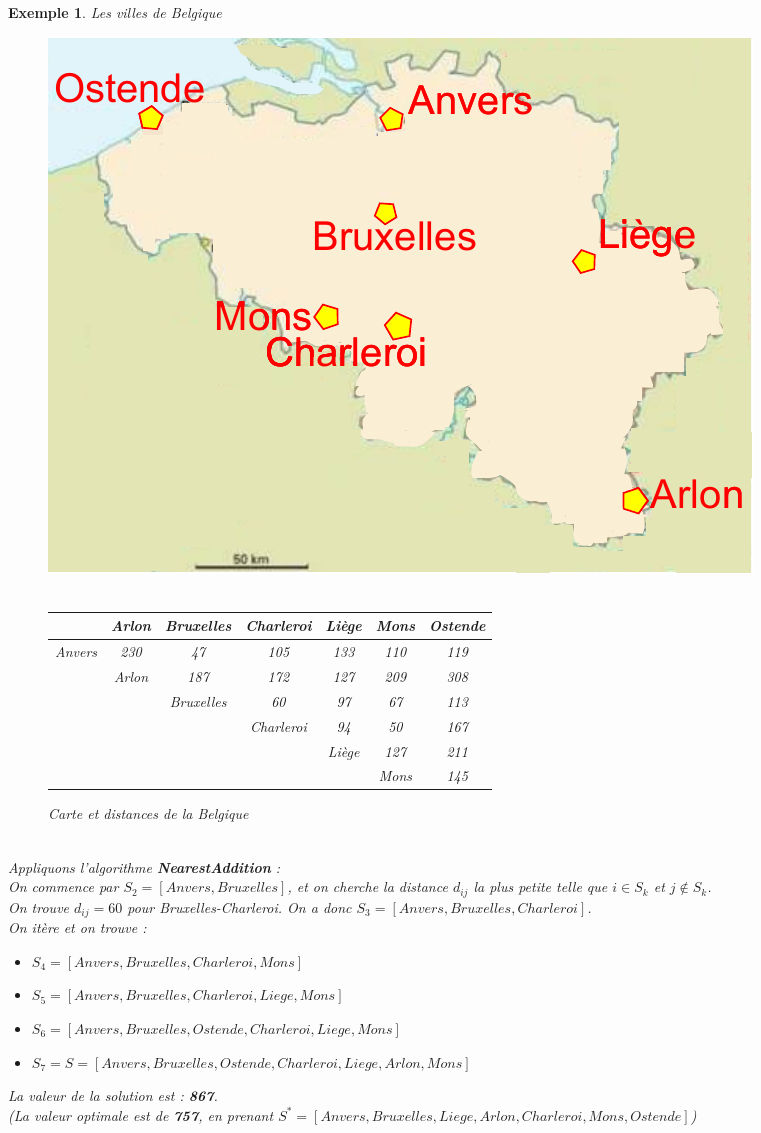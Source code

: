 \documentclass[12pt]{article}
\newtheorem{exemple}{Exemple}[section]
\begin{document}
\begin{exemple}Les villes de Belgique\\
\begin{figure}[h!]
    \begin{center}
    \includegraphics[scale=0.5]{belgique.pdf}$ $\\$ $\\
    \begin{tabular}{r|c|c|c|c|c|c|}
	 & Arlon & Bruxelles & Charleroi & Liège & Mons & Ostende \\
	\hline
	Anvers & 230 & 47 & 105 & 133 & 110 & 119 \\
	& Arlon & 187 & 172 & 127 & 209 & 308 \\
	& & Bruxelles & 60 & 97 & 67 & 113 \\
	& & & Charleroi & 94 & 50 & 167 \\
	& & & & Liège & 127 & 211 \\
	& & & & & Mons & 145
	\end{tabular}
    \caption{Carte et distances de la Belgique}
    \end{center}
\end{figure}
$ $\\
Appliquons l'algorithme \textbf{NearestAddition} : \\
On commence par $S_2 = [Anvers,Bruxelles]$, et on cherche la distance $d_{ij}$ la plus petite telle que $i\in S_k$ et $j \not\in S_k$.\\
On trouve $d_{ij} = 60$ pour Bruxelles-Charleroi. On a donc $S_3 = [Anvers,Bruxelles,Charleroi]$.\\
On itère et on trouve :
\begin{itemize}
\item $S_4 = [Anvers,Bruxelles,Charleroi,Mons]$
\item $S_5 = [Anvers,Bruxelles,Charleroi,Liege,Mons]$
\item $S_6 = [Anvers,Bruxelles,Ostende,Charleroi,Liege,Mons]$
\item $S_7 = S = [Anvers,Bruxelles,Ostende,Charleroi,Liege,Arlon,Mons]$
\end{itemize}
La valeur de la solution est : \textbf{867}. \\
\textit{(La valeur optimale est de \textbf{757}, en prenant $S^* = [Anvers,Bruxelles,Liege,Arlon,Charleroi,Mons,Ostende]$)}
\end{exemple}
\end{document}
